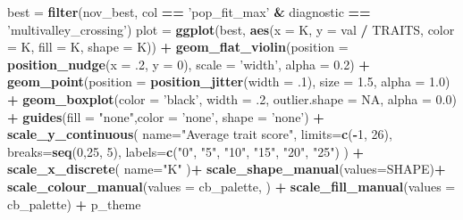 \documentclass[]{book}
\newenvironment{Shaded}{\begin{snugshade}}{\end{snugshade}}
\newcommand{\DataTypeTok}[1]{\textcolor[rgb]{0.13,0.29,0.53}{#1}}
\newcommand{\DecValTok}[1]{\textcolor[rgb]{0.00,0.00,0.81}{#1}}
\newcommand{\FloatTok}[1]{\textcolor[rgb]{0.00,0.00,0.81}{#1}}
\newcommand{\KeywordTok}[1]{\textcolor[rgb]{0.13,0.29,0.53}{\textbf{#1}}}
\newcommand{\NormalTok}[1]{#1}
\newcommand{\OperatorTok}[1]{\textcolor[rgb]{0.81,0.36,0.00}{\textbf{#1}}}
\newcommand{\OtherTok}[1]{\textcolor[rgb]{0.56,0.35,0.01}{#1}}
\newcommand{\StringTok}[1]{\textcolor[rgb]{0.31,0.60,0.02}{#1}}
\begin{document}
\begin{Shaded}
\begin{Highlighting}[]
\NormalTok{best =}\StringTok{ }\KeywordTok{filter}\NormalTok{(nov_best, col }\OperatorTok{==}\StringTok{ 'pop_fit_max'} \OperatorTok{&}\StringTok{ }\NormalTok{diagnostic }\OperatorTok{==}\StringTok{ 'multivalley_crossing'}\NormalTok{)}
\NormalTok{plot =}\StringTok{  }\KeywordTok{ggplot}\NormalTok{(best, }\KeywordTok{aes}\NormalTok{(}\DataTypeTok{x =}\NormalTok{ K, }\DataTypeTok{y =}\NormalTok{ val }\OperatorTok{/}\StringTok{ }\NormalTok{TRAITS, }\DataTypeTok{color =}\NormalTok{ K, }\DataTypeTok{fill =}\NormalTok{ K, }\DataTypeTok{shape =}\NormalTok{ K)) }\OperatorTok{+}
\StringTok{          }\KeywordTok{geom_flat_violin}\NormalTok{(}\DataTypeTok{position =} \KeywordTok{position_nudge}\NormalTok{(}\DataTypeTok{x =} \FloatTok{.2}\NormalTok{, }\DataTypeTok{y =} \DecValTok{0}\NormalTok{), }\DataTypeTok{scale =} \StringTok{'width'}\NormalTok{, }\DataTypeTok{alpha =} \FloatTok{0.2}\NormalTok{) }\OperatorTok{+}
\StringTok{          }\KeywordTok{geom_point}\NormalTok{(}\DataTypeTok{position =} \KeywordTok{position_jitter}\NormalTok{(}\DataTypeTok{width =} \FloatTok{.1}\NormalTok{), }\DataTypeTok{size =} \FloatTok{1.5}\NormalTok{, }\DataTypeTok{alpha =} \FloatTok{1.0}\NormalTok{) }\OperatorTok{+}
\StringTok{          }\KeywordTok{geom_boxplot}\NormalTok{(}\DataTypeTok{color =} \StringTok{'black'}\NormalTok{, }\DataTypeTok{width =} \FloatTok{.2}\NormalTok{, }\DataTypeTok{outlier.shape =} \OtherTok{NA}\NormalTok{, }\DataTypeTok{alpha =} \FloatTok{0.0}\NormalTok{) }\OperatorTok{+}
\StringTok{          }\KeywordTok{guides}\NormalTok{(}\DataTypeTok{fill =} \StringTok{"none"}\NormalTok{,}\DataTypeTok{color =} \StringTok{'none'}\NormalTok{, }\DataTypeTok{shape =} \StringTok{'none'}\NormalTok{) }\OperatorTok{+}
\StringTok{          }\KeywordTok{scale_y_continuous}\NormalTok{(}
            \DataTypeTok{name=}\StringTok{"Average trait score"}\NormalTok{,}
            \DataTypeTok{limits=}\KeywordTok{c}\NormalTok{(}\OperatorTok{-}\DecValTok{1}\NormalTok{, }\DecValTok{26}\NormalTok{),}
            \DataTypeTok{breaks=}\KeywordTok{seq}\NormalTok{(}\DecValTok{0}\NormalTok{,}\DecValTok{25}\NormalTok{, }\DecValTok{5}\NormalTok{),}
            \DataTypeTok{labels=}\KeywordTok{c}\NormalTok{(}\StringTok{"0"}\NormalTok{, }\StringTok{"5"}\NormalTok{, }\StringTok{"10"}\NormalTok{, }\StringTok{"15"}\NormalTok{, }\StringTok{"20"}\NormalTok{, }\StringTok{"25"}\NormalTok{)}
\NormalTok{          ) }\OperatorTok{+}
\StringTok{          }\KeywordTok{scale_x_discrete}\NormalTok{(}
            \DataTypeTok{name=}\StringTok{"K"}
\NormalTok{          )}\OperatorTok{+}
\StringTok{          }\KeywordTok{scale_shape_manual}\NormalTok{(}\DataTypeTok{values=}\NormalTok{SHAPE)}\OperatorTok{+}
\StringTok{          }\KeywordTok{scale_colour_manual}\NormalTok{(}\DataTypeTok{values =}\NormalTok{ cb_palette, ) }\OperatorTok{+}
\StringTok{          }\KeywordTok{scale_fill_manual}\NormalTok{(}\DataTypeTok{values =}\NormalTok{ cb_palette) }\OperatorTok{+}
\StringTok{          }\NormalTok{p_theme}


\end{Highlighting}
\end{Shaded}
\end{document}
